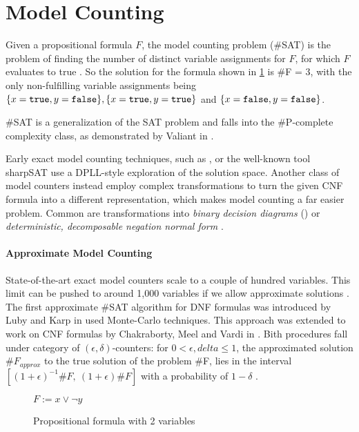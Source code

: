 \section{Model Counting}

Given a propositional formula $F$, the model counting problem (\#SAT) is the problem of finding the number of distinct variable assignments for $F$, for which $F$ evaluates to true \cite{biere09}. So the solution for the formula shown in  \ref{fig:satEx} is \#F = 3, with the only non-fulfilling variable assignments being $\{ x = \mathtt{true}, y = \mathtt{false}\}, \{x = \mathtt{true}, y = \mathtt{true}\}$ and  $\{x = \mathtt{false}, y = \mathtt{false}\}$.

\#SAT is a generalization of the SAT problem and falls into the \#P-complete complexity class, as demonstrated by Valiant in \cite{valiant79}.

Early exact model counting techniques, such as \cite{birnbaum99}, or the well-known tool sharpSAT \cite{thurley06} use a DPLL-style exploration of the solution space. Another class of model counters instead employ complex transformations to turn the given CNF formula into a different representation, which makes model counting a far easier problem. Common are transformations into \emph{binary decision diagrams} () or \emph{deterministic, decomposable negation normal form} \cite{darwiche04}.

\paragraph*{Approximate Model Counting}
State-of-the-art exact model counters scale to a couple of hundred variables.  This limit can be pushed to around 1,000 variables if we allow approximate solutions \cite{biere09}.
The first approximate \#SAT algorithm for DNF formulas was introduced by Luby and Karp in \cite{karp89} used Monte-Carlo techniques. This approach was extended to work on CNF formulas by Chakraborty, Meel and Vardi in \cite{chakraborty13}. Bith procedures fall under category of $(\epsilon, \delta)$-counters: for $0 < \epsilon, delta \leq 1$, the approximated solution $\#F_{approx}$ to the true solution of the problem \#F, lies in the interval $[(1 + \epsilon)^{-1} \#F, \: (1 + \epsilon) \#F]$ with a probability of $1 - \delta$ \cite{karp89,chakraborty13}.

\begin{figure}
    \centering
    $F := x \lor \lnot y$
    \caption{Propositional formula with 2 variables}
    \label{fig:satEx}
\end{figure}

